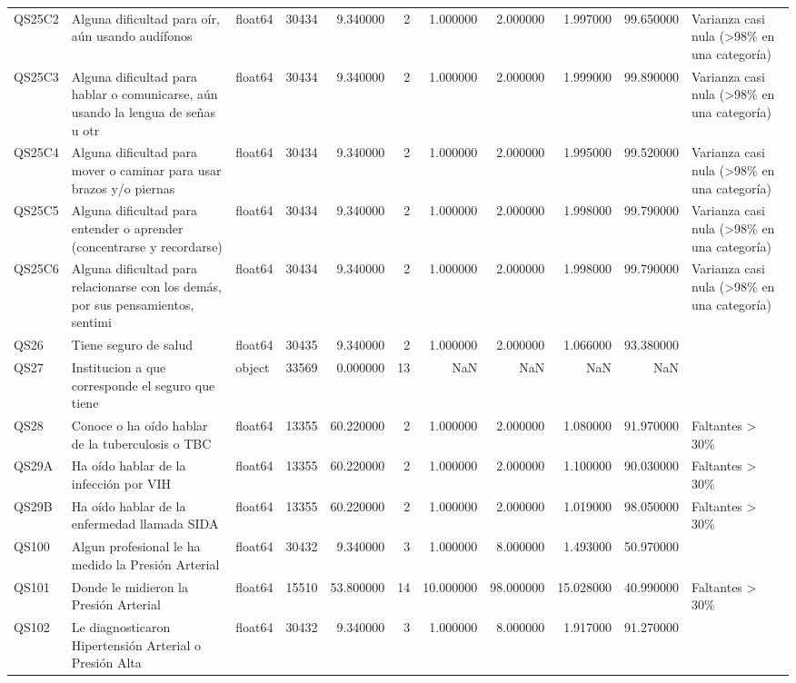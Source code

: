 \begin{longtable}{lllrrrrrrrl}
QS25C2 & Alguna dificultad para oír, aún usando audífonos & float64 & 30434 & 9.340000 & 2 & 1.000000 & 2.000000 & 1.997000 & 99.650000 & Varianza casi nula (>98\% en una categoría) \\
QS25C3 & Alguna dificultad para hablar o comunicarse, aún usando la lengua de señas u otr & float64 & 30434 & 9.340000 & 2 & 1.000000 & 2.000000 & 1.999000 & 99.890000 & Varianza casi nula (>98\% en una categoría) \\
QS25C4 & Alguna dificultad para mover o caminar para usar brazos y/o piernas & float64 & 30434 & 9.340000 & 2 & 1.000000 & 2.000000 & 1.995000 & 99.520000 & Varianza casi nula (>98\% en una categoría) \\
QS25C5 & Alguna dificultad para entender o aprender (concentrarse y recordarse) & float64 & 30434 & 9.340000 & 2 & 1.000000 & 2.000000 & 1.998000 & 99.790000 & Varianza casi nula (>98\% en una categoría) \\
QS25C6 & Alguna dificultad para relacionarse con los demás, por sus pensamientos, sentimi & float64 & 30434 & 9.340000 & 2 & 1.000000 & 2.000000 & 1.998000 & 99.790000 & Varianza casi nula (>98\% en una categoría) \\
QS26 & Tiene seguro de salud & float64 & 30435 & 9.340000 & 2 & 1.000000 & 2.000000 & 1.066000 & 93.380000 &  \\
QS27 & Institucion a que corresponde el seguro que tiene & object & 33569 & 0.000000 & 13 & NaN & NaN & NaN & NaN &  \\
QS28 & Conoce o ha oído hablar de la tuberculosis o TBC & float64 & 13355 & 60.220000 & 2 & 1.000000 & 2.000000 & 1.080000 & 91.970000 & Faltantes > 30\% \\
QS29A & Ha oído hablar de la infección por VIH & float64 & 13355 & 60.220000 & 2 & 1.000000 & 2.000000 & 1.100000 & 90.030000 & Faltantes > 30\% \\
QS29B & Ha oído hablar de la enfermedad llamada SIDA & float64 & 13355 & 60.220000 & 2 & 1.000000 & 2.000000 & 1.019000 & 98.050000 & Faltantes > 30\% \\
QS100 & Algun profesional le ha medido la Presión Arterial & float64 & 30432 & 9.340000 & 3 & 1.000000 & 8.000000 & 1.493000 & 50.970000 &  \\
QS101 & Donde le midieron la Presión Arterial & float64 & 15510 & 53.800000 & 14 & 10.000000 & 98.000000 & 15.028000 & 40.990000 & Faltantes > 30\% \\
QS102 & Le diagnosticaron Hipertensión Arterial o Presión Alta & float64 & 30432 & 9.340000 & 3 & 1.000000 & 8.000000 & 1.917000 & 91.270000 &  \\

\end{longtable}
